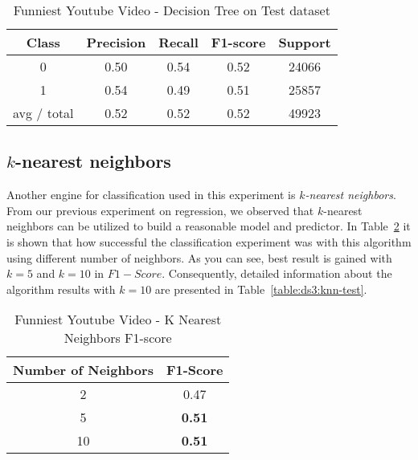 \begin{table}[p]
\begin{center}
\begin{tabular}{|c|c|c|c|c|}
\hline Class & Precision & Recall & F1-score & Support \\

\hline 0 & 0.50 & 0.54 & 0.52 & 24066\\
\hline 1 & 0.54 & 0.49 & 0.51 & 25857\\
\hline avg / total & 0.52 & 0.52 & 0.52 & 49923\\
\hline
\end{tabular}

\caption{Funniest Youtube Video - Decision Tree on Test dataset}
\label{table:db2:decisiontree-test}
\end{center}
\end{table}

\subsection{$k$-nearest neighbors}

Another engine for classification used in this experiment is {\it
$k$-nearest neighbors}. From our previous experiment on regression, we observed
that $k$-nearest neighbors can be utilized to build a reasonable model and
predictor. In Table~\ref{table:ds3:knn} it is shown that how successful the
classification experiment was with this algorithm using different number of neighbors. As you
can see, best result is gained with $k=5$ and $k=10$ in $F1-Score$.
Consequently, detailed information about the algorithm results with $k=10$ are
presented in Table~\ref{table:ds3:knn-test}.


\begin{table}[p]
\begin{center}
\begin{tabular}{|c|c|}
\hline Number of Neighbors & F1-Score \\

\hline 2 & 0.47 \\
\hline 5 & {\bf 0.51} \\
\hline 10 & {\bf 0.51} \\

\hline
\end{tabular}

\caption{Funniest Youtube Video - K Nearest Neighbors  F1-score}
\label{table:ds3:knn}
\end{center}
\end{table}

